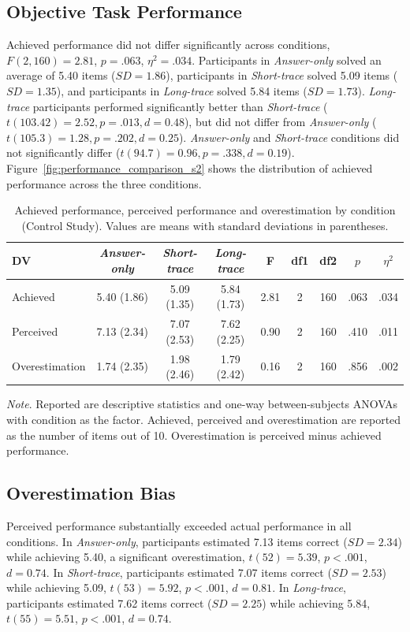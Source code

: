 \documentclass[manuscript,review,anonymous]{acmart}
\begin{document}
\subsection{Objective Task Performance}
Achieved performance did not differ significantly across conditions, $F(2,
160) = 2.81$, $p = .063$, $\eta^2 = .034$. Participants in \textit{Answer-only}
solved an average of 5.40 items ($SD = 1.86$), participants in
\textit{Short-trace} solved 5.09 items ($SD = 1.35$), and participants in
\textit{Long-trace} solved 5.84 items ($SD = 1.73$).
\textit{Long-trace} participants performed significantly better than
\textit{Short-trace} ($t(103.42) = 2.52, p = .013, d = 0.48$), but did not differ
from \textit{Answer-only} ($t(105.3) = 1.28, p = .202, d = 0.25$).
\textit{Answer-only} and \textit{Short-trace} conditions did not significantly
differ ($t(94.7) = 0.96, p = .338, d = 0.19$).
Figure~\ref{fig:performance_comparison_s2} shows the distribution of achieved
performance across the three conditions.


\begin{table}[!htp]
\centering
\caption{Achieved performance, perceived performance and overestimation by
condition (Control Study). Values are means with standard deviations in parentheses.}
\label{tab:study2_desc}
\begin{tabular}{lcccccccc}
\hline
DV & \textit{Answer-only} & \textit{Short-trace} & \textit{Long-trace} & F & df1 & df2 & $p$ & $\eta^2$ \\ \hline
Achieved       & 5.40 (1.86) & 5.09 (1.35) & 5.84 (1.73) & 2.81 & 2 & 160 & .063     & .034 \\
Perceived      & 7.13 (2.34) & 7.07 (2.53) & 7.62 (2.25) & 0.90 & 2 & 160 & .410     & .011 \\
Overestimation & 1.74 (2.35) & 1.98 (2.46) & 1.79 (2.42) & 0.16 & 2 & 160 & .856     & .002 \\
\hline
\end{tabular}


\raggedright \small \textit{Note}. Reported are descriptive statistics and
one-way between-subjects ANOVAs with condition as the factor. Achieved,
perceived and overestimation are reported as the number of items out of 10.
Overestimation is perceived minus achieved performance.
\end{table}


\subsection{Overestimation Bias}
Perceived performance substantially exceeded actual performance in all
conditions. In \textit{Answer-only}, participants estimated 7.13 items correct
($SD = 2.34$) while achieving 5.40, a significant overestimation, $t(52) =
5.39$, $p < .001$, $d = 0.74$. In \textit{Short-trace}, participants estimated
7.07 items correct ($SD = 2.53$) while achieving 5.09, $t(53) = 5.92$, $p <
.001$, $d = 0.81$. In \textit{Long-trace}, participants estimated 7.62 items
correct ($SD = 2.25$) while achieving 5.84, $t(55) = 5.51$, $p < .001$, $d =
0.74$.
\end{document}
